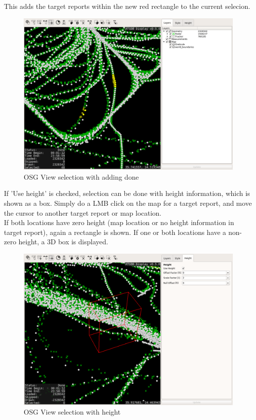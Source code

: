This adds the target reports within the new red rectangle to the current selecion.

\begin{figure}[H]
    \hspace*{-2.5cm}
    \includegraphics[width=19cm,frame]{../screenshots/osgview_select_add2.png}
  \caption{OSG View selection with adding done}
\end{figure}

If 'Use height' is checked, selection can be done with height information, which is shown as a box. Simply do a LMB click on the map for a target report, and move the cursor to another target report or map location.  \\

If both locations have zero height (map location or no height information in target report), again a rectangle is shown. If one or both locations have a non-zero height, a 3D box is displayed.

\begin{figure}[H]
    \hspace*{-2.5cm}
    \includegraphics[width=19cm,frame]{../screenshots/osgview_select3d.png}
  \caption{OSG View selection with height}
\end{figure}


